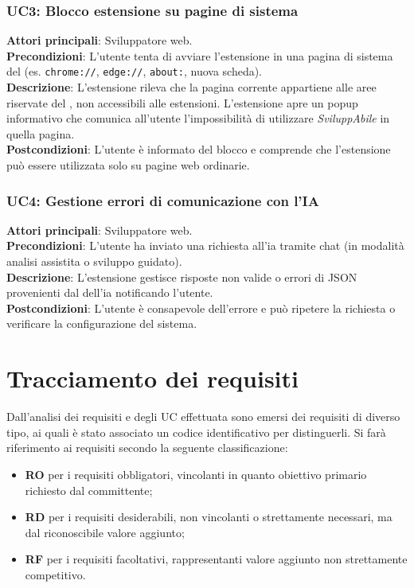 \subsubsection*{UC3: Blocco estensione su pagine di sistema}
\noindent \textbf{Attori principali}: Sviluppatore web.\\
\textbf{Precondizioni}: L’utente tenta di avviare l’estensione in una pagina di sistema del  (es. \texttt{chrome://}, \texttt{edge://}, \texttt{about:}, nuova scheda).\\
\textbf{Descrizione}: L’estensione rileva che la pagina corrente appartiene alle aree riservate del , non accessibili alle estensioni. L'estensione apre un popup informativo che comunica all’utente l’impossibilità di utilizzare \textit{SviluppAbile} in quella pagina.\\
\textbf{Postcondizioni}: L’utente è informato del blocco e comprende che l’estensione può essere utilizzata solo su pagine web ordinarie.\\

\subsubsection*{UC4: Gestione errori di comunicazione con l’IA}
\noindent \textbf{Attori principali}: Sviluppatore web.\\
\textbf{Precondizioni}: L’utente ha inviato una richiesta all’\acrshort{ia} tramite chat (in modalità analisi assistita o sviluppo guidato).\\
\textbf{Descrizione}: L’estensione gestisce risposte non valide o errori di  JSON provenienti dal  dell’\acrshort{ia} notificando l’utente.\\
\textbf{Postcondizioni}: L’utente è consapevole dell’errore e può ripetere la richiesta o verificare la configurazione del sistema.\\


\section{Tracciamento dei requisiti}
\label{sec:req}
\noindent Dall’analisi dei requisiti e degli UC effettuata sono emersi dei requisiti di diverso tipo, ai quali è stato associato un codice identificativo per distinguerli. Si farà riferimento ai requisiti secondo la seguente classificazione:
\begin{itemize}
    \item \textbf{RO} per i requisiti obbligatori, vincolanti in quanto obiettivo primario richiesto dal committente;
    \item \textbf{RD} per i requisiti desiderabili, non vincolanti o strettamente necessari, ma dal riconoscibile valore aggiunto;
    \item \textbf{RF} per i requisiti facoltativi, rappresentanti valore aggiunto non strettamente competitivo.
\end{itemize}


